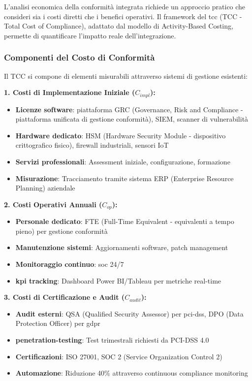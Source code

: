 L'analisi economica della conformità integrata richiede un approccio pratico che consideri sia i costi diretti che i benefici operativi. Il framework del \gls{tcc} (TCC - Total Cost of Compliance), adattato dal modello di Activity-Based Costing\autocite{Kaplan2007}, permette di quantificare l'impatto reale dell'integrazione.

\subsubsection{Componenti del Costo di Conformità}

Il TCC si compone di elementi misurabili attraverso sistemi di gestione esistenti:

\textbf{1. Costi di Implementazione Iniziale ($C_{impl}$):}
\begin{itemize}
    \item \textbf{Licenze software}: piattaforma GRC (Governance, Risk and Compliance - piattaforma unificata di gestione conformità), SIEM, scanner di vulnerabilità
    \item \textbf{Hardware dedicato}: HSM (Hardware Security Module - dispositivo crittografico fisico), firewall industriali, sensori IoT
    \item \textbf{Servizi professionali}: Assessment iniziale, configurazione, formazione
    \item \textbf{Misurazione}: Tracciamento tramite sistema ERP (Enterprise Resource Planning) aziendale
\end{itemize}

\textbf{2. Costi Operativi Annuali ($C_{op}$):}
\begin{itemize}
    \item \textbf{Personale dedicato}: FTE (Full-Time Equivalent - equivalenti a tempo pieno) per gestione conformità
    \item \textbf{Manutenzione sistemi}: Aggiornamenti software, patch management
    \item \textbf{Monitoraggio continuo}: \gls{soc} 24/7
    \item \textbf{\gls{kpi} tracking}: Dashboard Power BI/Tableau per metriche real-time
\end{itemize}

\textbf{3. Costi di Certificazione e Audit ($C_{audit}$):}
\begin{itemize}
    \item \textbf{Audit esterni}: QSA (Qualified Security Assessor) per \gls{pci-dss}, DPO (Data Protection Officer) per \gls{gdpr}
    \item \textbf{\gls{penetration-testing}}: Test trimestrali richiesti da PCI-DSS 4.0
    \item \textbf{Certificazioni}: ISO 27001, SOC 2 (Service Organization Control 2)
    \item \textbf{Automazione}: Riduzione 40\% attraverso continuous \gls{compliance} monitoring
\end{itemize}

